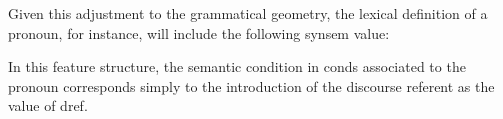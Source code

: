 \documentclass[output=paper
,modfonts
,nonflat]{langsci/langscibook}
\begin{document}
Given this adjustment to the grammatical geometry, 
the lexical definition of a pronoun,
for instance, will include the following {\sc synsem} value:

\avmoptions{}




In this feature structure, the semantic condition in {\sc conds} associated
to the pronoun corresponds simply to the introduction of the discourse referent 
as the value of {\sc dref}.
\end{document}
